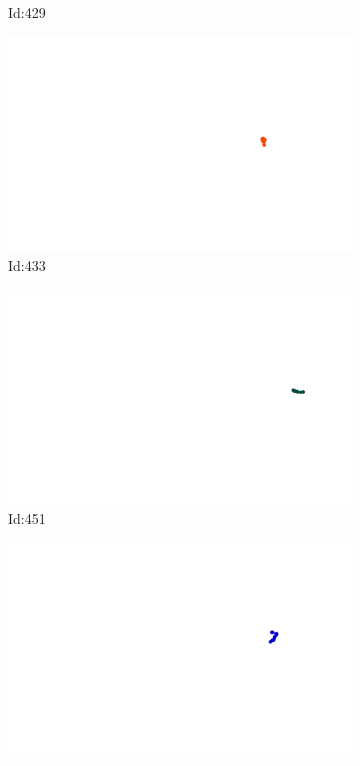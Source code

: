 \documentclass[12pt,twoside]{report}
\begin{document}
\begin{figure}
\begin{subfigure}[b]{0.20\textwidth}
\caption{Id:429}
\end{subfigure}
\begin{subfigure}[b]{0.20\textwidth}
\centering
\includegraphics[width=\textwidth]{../trajectories/433.png}
\caption{Id:433}
\end{subfigure}
\begin{subfigure}[b]{0.20\textwidth}
\centering
\includegraphics[width=\textwidth]{../trajectories/451.png}
\caption{Id:451}
\end{subfigure}
\begin{subfigure}[b]{0.20\textwidth}
\centering
\includegraphics[width=\textwidth]{../trajectories/459.png}

\end{subfigure}
\end{figure}
\end{document}
